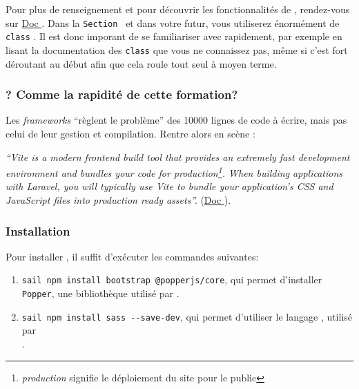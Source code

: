 Pour plus de renseignement et pour découvrir les fonctionnalités de \bs{}, rendez-vous sur \href{https://getbootstrap.com/docs/5.3/getting-started/introduction/}{Doc \bs{}}. Dans la \texttt{Section } et dans votre futur, vous utiliserez énormément de \verb|class| \bs. Il est donc imporant de se familiariser avec rapidement, par exemple en lisant la documentation des \verb|class| que vous ne connaissez pas, même si c'est fort déroutant au début afin que cela roule tout seul à moyen terme.

\subsubsection[Vite][laravel.com/docs/10.x/vite\#introduction]{\vite{}? Comme la rapidité de cette formation?}
Les \textit{frameworks} ``règlent le problème'' des 10000 lignes de code à écrire, mais pas celui de leur gestion et compilation. Rentre alors en scène \vite:

\textit{``Vite is a modern frontend build tool that provides an extremely fast development environment and bundles your code for production\footnote{\textit{production} signifie le déploiement du site pour le public}. When building applications with Laravel, you will typically use Vite to bundle your application's CSS and JavaScript files into production ready assets''.} (\href{https://laravel.com/docs/10.x/vite#introduction}{Doc \laravel{}}).

\subsubsection[Installation]{Installation}

Pour installer \bs{}, il suffit d'exécuter les commandes suivantes:
\begin{enumerate}
    \item \verb|sail npm install bootstrap @popperjs/core|, qui permet d'installer \verb|Popper|, une bibliothèque \js{} utilisé par \bs{}.
    \item \verb|sail npm install sass --save-dev|, qui permet d'utiliser le langage \sass{}, utilisé par \\ \bs{}.
\end{enumerate}

